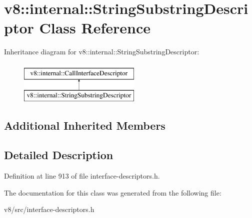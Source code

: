 \hypertarget{classv8_1_1internal_1_1StringSubstringDescriptor}{}\section{v8\+:\+:internal\+:\+:String\+Substring\+Descriptor Class Reference}
\label{classv8_1_1internal_1_1StringSubstringDescriptor}
Inheritance diagram for v8\+:\+:internal\+:\+:String\+Substring\+Descriptor\+:\begin{figure}[H]
\begin{center}
\leavevmode
\includegraphics[height=2.000000cm]{classv8_1_1internal_1_1StringSubstringDescriptor}
\end{center}
\end{figure}
\subsection*{Additional Inherited Members}


\subsection{Detailed Description}


Definition at line 913 of file interface-\/descriptors.\+h.



The documentation for this class was generated from the following file\+:\begin{DoxyCompactItemize}
\item 
v8/src/interface-\/descriptors.\+h\end{DoxyCompactItemize}
